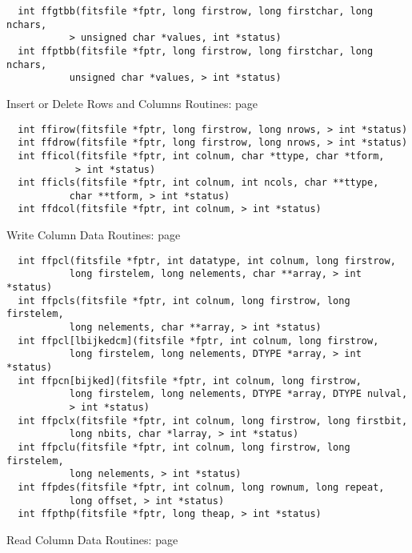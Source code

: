 \begin{verbatim}
  int ffgtbb(fitsfile *fptr, long firstrow, long firstchar, long nchars,
           > unsigned char *values, int *status)
  int ffptbb(fitsfile *fptr, long firstrow, long firstchar, long nchars,
           unsigned char *values, > int *status)
\end{verbatim}
 Insert or Delete Rows and Columns Routines: page~\pageref{FFIROW}

\begin{verbatim}
  int ffirow(fitsfile *fptr, long firstrow, long nrows, > int *status)
  int ffdrow(fitsfile *fptr, long firstrow, long nrows, > int *status)
  int fficol(fitsfile *fptr, int colnum, char *ttype, char *tform,
            > int *status)
  int fficls(fitsfile *fptr, int colnum, int ncols, char **ttype,
           char **tform, > int *status)
  int ffdcol(fitsfile *fptr, int colnum, > int *status)
\end{verbatim}
 Write Column Data Routines: page~\pageref{FFPCLS}

\begin{verbatim}
  int ffpcl(fitsfile *fptr, int datatype, int colnum, long firstrow,
           long firstelem, long nelements, char **array, > int *status)
  int ffpcls(fitsfile *fptr, int colnum, long firstrow, long firstelem,
           long nelements, char **array, > int *status)
  int ffpcl[lbijkedcm](fitsfile *fptr, int colnum, long firstrow,
           long firstelem, long nelements, DTYPE *array, > int *status)
  int ffpcn[bijked](fitsfile *fptr, int colnum, long firstrow,
           long firstelem, long nelements, DTYPE *array, DTYPE nulval,
           > int *status)
  int ffpclx(fitsfile *fptr, int colnum, long firstrow, long firstbit,
           long nbits, char *larray, > int *status)
  int ffpclu(fitsfile *fptr, int colnum, long firstrow, long firstelem,
           long nelements, > int *status)
  int ffpdes(fitsfile *fptr, int colnum, long rownum, long repeat,
           long offset, > int *status)
  int ffpthp(fitsfile *fptr, long theap, > int *status)
\end{verbatim}
 Read Column Data Routines: page~\pageref{FFGCL}

